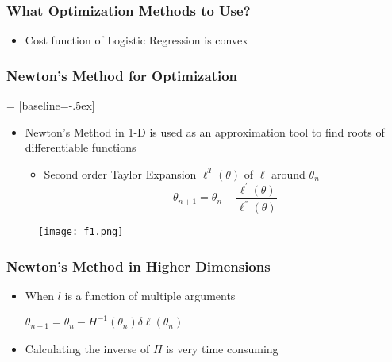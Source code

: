 \everymath{\displaystyle}



\begin{frame}
\frametitle{What Optimization Methods to Use?}

\begin{itemize}
\item Cost function of Logistic Regression is convex
\end{itemize}

\end{frame}





\begin{frame}
\frametitle{Newton's Method for Optimization}

 = [baseline=-.5ex]

\begin{itemize}
    \item  Newton's Method in 1-D is used as an approximation tool to find roots of differentiable functions
      \begin{itemize}
       \item Second order Taylor Expansion $\ell^T(\theta)$ of $\ell$ around $\theta_n$
       \begin{equation}
       \theta_{n+1} = \theta_n - \frac{\ell^{'}(\theta)}{\ell^{''}(\theta)}
       \end{equation}
      \end{itemize}
    \end{itemize}

    \begin{figure}[!h]
\begin{center}
\texttt{[image: f1.png]}
\end{center}
\label{12345678 figure name }%
\end{figure}

\end{frame}


 
 
\begin{frame}
\frametitle{Newton's Method in Higher Dimensions}
\begin{itemize}
       \item When $l$ is a function of multiple arguments
       \begin{center}
       $\theta_{n+1} = \theta_n - H^{-1} (\theta_n) \delta \ell(\theta_n)$
       \end{center}
       \item Calculating the inverse of $H$ is very time consuming 
        
   \end{itemize}
  \end{frame}
    




